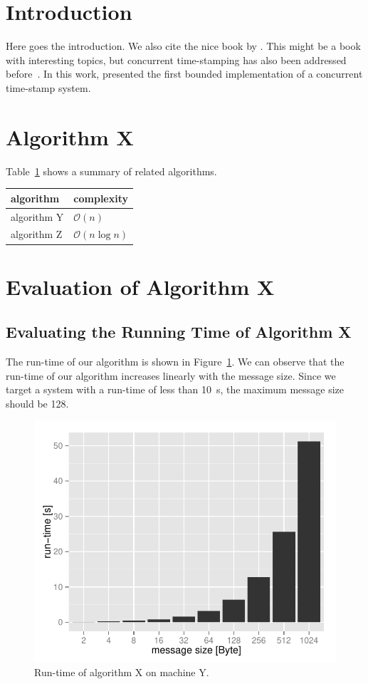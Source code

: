 
\section{Introduction}

Here goes the introduction. We also cite the nice book by \citet{Pinedo:2012}.
This might be a book with interesting topics, but concurrent time-stamping has also been addressed before~\cite{Dolev97}.
In this work, \citet{Dolev97} presented the first bounded implementation of a concurrent time-stamp system.


\section{Algorithm X}

Table~\ref{tab:related_algorithms} shows a summary of related algorithms.

\begin{table}[h]
\centering
{}
\label{tab:related_algorithms}
\begin{tabular}{ll}
\toprule 
algorithm & complexity \\
\midrule
algorithm Y & $\mathcal{O}(n)$ \\
algorithm Z & $\mathcal{O}(n \log{n} )$ \\
\bottomrule
\end{tabular}
\end{table}

\section{Evaluation of Algorithm X}


\subsection{Evaluating the Running Time of Algorithm X}

The run-time of our algorithm is shown in Figure~\ref{fig:runtime}.
We can observe that the run-time of our algorithm increases linearly with the message size.
Since we target a system with a run-time of less than \SI{10}{\second}, the maximum message size should be \SI{128}{\byte}.

\begin{figure}[h]
\centering
\includegraphics[width=.5\linewidth]{figures/runtime}
\caption{Run-time of algorithm X on machine Y.}
\label{fig:runtime}
\end{figure}

